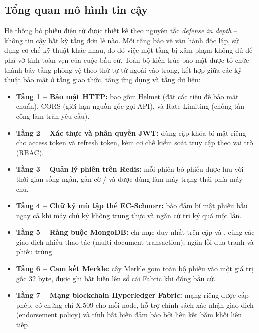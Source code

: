 \subsection{Tổng quan mô hình tin cậy}

Hệ thống bỏ phiếu điện tử được thiết kế theo nguyên tắc \textit{defense in depth} -- không tin cậy bất kỳ tầng đơn lẻ nào. Mỗi tầng bảo vệ vận hành độc lập, sử dụng cơ chế kỹ thuật khác nhau, do đó việc một tầng bị xâm phạm không đủ để phá vỡ tính toàn vẹn của cuộc bầu cử. Toàn bộ kiến trúc bảo mật được tổ chức thành bảy tầng phòng vệ theo thứ tự từ ngoài vào trong, kết hợp giữa các kỹ thuật bảo mật ở tầng giao thức, tầng ứng dụng và tầng dữ liệu:

\begin{itemize}
    \item \textbf{Tầng 1 -- Bảo mật HTTP:} bao gồm Helmet (đặt các tiêu đề bảo mật chuẩn), CORS (giới hạn nguồn gốc gọi API), và Rate Limiting (chống tấn công làm tràn yêu cầu).

    \item \textbf{Tầng 2 -- Xác thực và phân quyền JWT:} dùng cặp khóa bí mật riêng cho access token và refresh token, kèm cơ chế kiểm soát truy cập theo vai trò (RBAC).

    \item \textbf{Tầng 3 -- Quản lý phiên trên Redis:} mỗi phiên bỏ phiếu được lưu với thời gian sống ngắn, gắn cờ / và được dùng làm máy trạng thái phía máy chủ.

    \item \textbf{Tầng 4 -- Chữ ký mù tập thể EC-Schnorr:} bảo đảm bí mật phiếu bầu ngay cả khi máy chủ ký không trung thực và ngăn cử tri ký quá một lần.

    \item \textbf{Tầng 5 -- Ràng buộc MongoDB:} chỉ mục duy nhất trên cặp  và , cùng các giao dịch nhiều thao tác (multi-document transaction), ngăn lỗi đua tranh và phiếu trùng.

    \item \textbf{Tầng 6 -- Cam kết Merkle:} cây Merkle gom toàn bộ phiếu vào một giá trị gốc 32 byte, được ghi bất biến lên sổ cái Fabric khi đóng bầu cử.

    \item \textbf{Tầng 7 -- Mạng blockchain Hyperledger Fabric:} mạng riêng được cấp phép, có chứng chỉ X.509 cho mỗi node, hỗ trợ chính sách xác nhận giao dịch (endorsement policy) và tính bất biến đảm bảo bởi liên kết băm khối liên tiếp.
\end{itemize}

